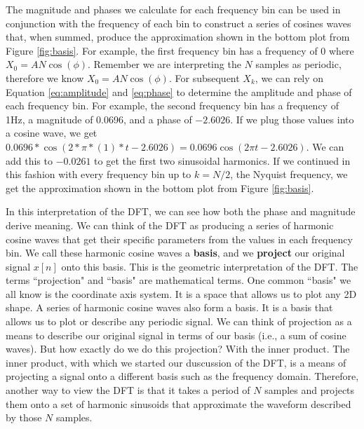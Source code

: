 The magnitude and phases we calculate for each frequency bin
can be used in conjunction with the frequency of each bin to construct a series of cosines waves that,
when summed, produce the approximation shown in the bottom plot from Figure \ref{fig:basis}.  For example,
the first frequency bin has a frequency of 0 where $X_0 = AN\cos(\phi)$. Remember we are interpreting the $N$ samples
as periodic, therefore we know $X_0 = AN\cos(\phi)$.  For subsequent $X_k$, we can rely on Equation \ref{eq:amplitude} and
\ref{eq:phase} to determine the amplitude and phase of each frequency bin.  For example, the second
 frequency bin has a frequency of 1Hz, a magnitude of 0.0696, and a phase of $-2.6026$.  If we plug those values into
 a cosine wave, we get $0.0696 * \cos(2 * \pi * (1) * t - 2.6026) = 0.0696\cos(2\pi t - 2.6026)$.  We can add this to
 $-0.0261$ to get the first two sinusoidal harmonics.  If we continued in this fashion with every frequency bin
 up to $k = N/2$, the Nyquist frequency, we get the approximation shown in the bottom plot from 
 Figure \ref{fig:basis}.  
 
 	In this interpretation of the DFT, we can see how both the phase and magnitude derive meaning.  We can think
 of the DFT as producing a series of harmonic cosine waves that get their specific parameters from the values in each
frequency bin.  We call these harmonic cosine waves a \textbf{basis}, and we \textbf{project} our original signal
$x[n]$ onto this basis.  This is the geometric interpretation of the DFT.  The terms ``projection" and ``basis" are 
mathematical terms.  One common ``basis" we all know is the coordinate axis system.  It is a space that allows us
to plot any 2D shape.  A series of harmonic cosine waves also form a basis.  It is a basis that allows us to 
plot or describe any periodic signal.  We can think of projection as a means to describe our original signal
 in terms of our basis (i.e., a sum of cosine waves).  But how exactly do we do this projection?  
 With the inner product.  The inner product, with which we started our duscussion of the DFT,
 is a means of projecting a signal onto a different basis such as the frequency domain.  Therefore, another way to
 view the DFT is that it takes a period of $N$ samples and projects them onto a set of harmonic sinusoids that
 approximate the waveform described by those $N$ samples.
